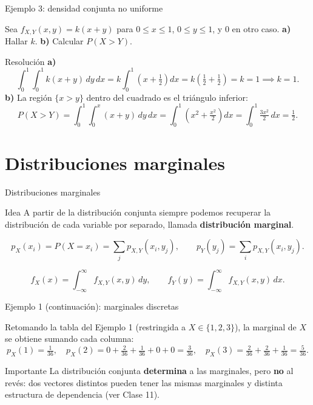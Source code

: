 \documentclass[aspectratio=169,11pt]{beamer}
\begin{document}
\begin{frame}{Ejemplo 3: densidad conjunta no uniforme}
\begin{example}
Sea $f_{X,Y}(x,y) = k(x+y)$ para $0 \le x \le 1$, $0 \le y \le 1$, y $0$ en otro caso.
\textbf{a)} Hallar $k$. \quad \textbf{b)} Calcular $P(X > Y)$.
\end{example}
\pause
\begin{block}{Resolución}
\textbf{a)}
\[
\int_0^1\int_0^1 k(x+y)\,dy\,dx = k\int_0^1 \left(x + \tfrac12\right) dx = k\left(\tfrac12 + \tfrac12\right) = k = 1 \implies k=1.
\]
\textbf{b)} La región $\{x>y\}$ dentro del cuadrado es el triángulo inferior:
\[
P(X>Y) = \int_0^1 \int_0^x (x+y)\, dy\, dx = \int_0^1 \left(x^2 + \tfrac{x^2}{2}\right) dx = \int_0^1 \tfrac{3x^2}{2}\,dx = \tfrac12.
\]
\end{block}
\end{frame}

\section{Distribuciones marginales}

\begin{frame}{Distribuciones marginales}
\begin{block}{Idea}
A partir de la distribución conjunta siempre podemos recuperar la distribución de cada variable por separado, llamada \textbf{distribución marginal}.
\end{block}
\begin{definition}
\[
p_X(x_i) = P(X=x_i) = \sum_j p_{X,Y}(x_i,y_j), \qquad p_Y(y_j) = \sum_i p_{X,Y}(x_i,y_j).
\]
\end{definition}
\begin{definition}
\[
f_X(x) = \int_{-\infty}^{\infty} f_{X,Y}(x,y)\, dy, \qquad f_Y(y) = \int_{-\infty}^{\infty} f_{X,Y}(x,y)\, dx.
\]
\end{definition}
\end{frame}

\begin{frame}{Ejemplo 1 (continuación): marginales discretas}
\begin{example}
Retomando la tabla del Ejemplo 1 (restringida a $X\in\{1,2,3\}$), la marginal de $X$ se obtiene sumando cada columna:
\[
p_X(1) = \tfrac{1}{36}, \quad p_X(2) = 0+\tfrac{2}{36}+\tfrac{1}{36}+0+0 = \tfrac{3}{36}, \quad p_X(3) = \tfrac{2}{36}+\tfrac{2}{36}+\tfrac{1}{36}=\tfrac{5}{36}.
\]
\end{example}
\begin{alertblock}{Importante}
La distribución conjunta \textbf{determina} a las marginales, pero \textbf{no} al revés: dos vectores distintos pueden tener las mismas marginales y distinta estructura de dependencia (ver Clase 11).
\end{alertblock}
\end{frame}
\end{document}
